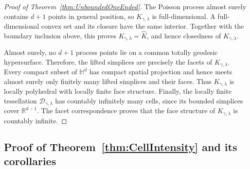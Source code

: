 \documentclass[11pt,a4paper]{article}
\theoremstyle{plain}
\theoremstyle{definition}
\theoremstyle{remark}
\def\HH{\mathbb{H}}
\def\RR{\mathbb{R}}
\def\cD{\mathcal{D}}
\begin{document}
\begin{proof}[Proof of Theorem~\ref{thm:UnboundedOneEnded}]
The Poisson process almost surely contains $d+1$ points
in general position, so $K_{\gamma,\lambda}$ is
full-dimensional. A full-dimensional convex set and its
closure have the same interior. Together with the boundary
inclusion above, this proves
$K_{\gamma,\lambda}=\widehat{K}$, and hence closedness of $K_{\gamma,\lambda}$.

Almost surely, no $d+1$ process points lie on a common
totally geodesic hypersurface. Therefore, the lifted
simplices are precisely the facets of $K_{\gamma,\lambda}$.
Every compact subset of $\HH^d$ has compact spatial
projection and hence meets almost surely only finitely many lifted
simplices and their faces. Thus $K_{\gamma,\lambda}$ is
locally polyhedral with locally finite face structure.
Finally, the locally finite tessellation
$\cD_{\gamma,\lambda}$ has countably infinitely many cells,
since its bounded simplices cover $\RR^{d-1}$.
The facet correspondence proves that the face structure
of $K_{\gamma,\lambda}$ is countably infinite.
\end{proof}



\subsection{Proof of Theorem~\ref{thm:CellIntensity} and its corollaries}
\end{document}

